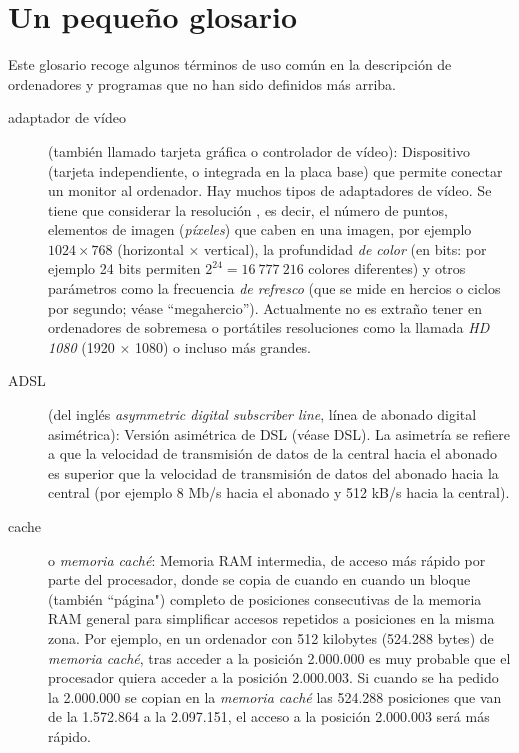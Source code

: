 \section{Un pequeño glosario} \label{ss:OiPgloss} Este glosario recoge algunos términos de uso común en la descripción de ordenadores y programas que no han sido definidos más arriba. 

\begin{description} \item[adaptador de vídeo] (también llamado tarjeta gráfica o controlador de vídeo): Dispositivo (tarjeta independiente, o integrada en la placa base) que permite conectar un monitor al ordenador. Hay muchos tipos de adaptadores de vídeo. Se tiene que considerar la resolución \emph{}, es decir, el número de puntos, elementos de imagen (\emph{píxeles}) que caben en una imagen, por ejemplo $1024 \times768$ (horizontal $\times$ vertical), la profundidad \emph{de color} (en bits: por ejemplo 24 bits permiten $2^{24}=16~777~216$ colores diferentes) y otros parámetros como la frecuencia {\em de refresco} (que se mide en hercios o ciclos por segundo; véase ``megahercio''). Actualmente no es extraño tener en ordenadores de sobremesa o portátiles resoluciones como la llamada \emph{HD 1080} (1920 $\times$ 1080) o incluso más grandes. 

\item[ADSL] (del inglés \emph{asymmetric digital subscriber line}, línea de abonado digital asimétrica): Versión asimétrica de DSL (véase DSL). La asimetría se refiere a que la velocidad de transmisión de datos de la central hacia el abonado es superior que la velocidad de transmisión de datos del abonado hacia la central (por ejemplo 8 Mb/s hacia el abonado y 512 kB/s hacia la central). 

\item[cache] o \emph{memoria caché}: Memoria RAM intermedia, de acceso más rápido por parte del procesador, donde se copia de cuando en cuando un bloque (también ``página") completo de posiciones consecutivas de la memoria RAM general para simplificar accesos repetidos a posiciones en la misma zona. Por ejemplo, en un ordenador con 512 kilobytes (524.288 bytes) de \emph{memoria caché}, tras acceder a la posición 2.000.000 es muy probable que el procesador quiera acceder a la posición 2.000.003. Si cuando se ha pedido la 2.000.000 se copian en la \emph{memoria caché} las 524.288 posiciones que van de la 1.572.864 a la 2.097.151, el acceso a la posición 2.000.003 será más rápido. 


\end{description}
